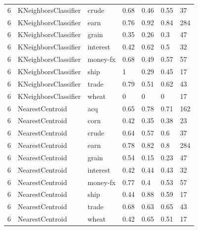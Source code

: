 \documentclass{article}
\begin{document}
\begin{table}[h]
\begin{tabular}{lllllll}
6             & KNeighborsClassifier   & crude           & 0.68               & 0.46            & 0.55              & 37               \\
6             & KNeighborsClassifier   & earn            & 0.76               & 0.92            & 0.84              & 284              \\
6             & KNeighborsClassifier   & grain           & 0.35               & 0.26            & 0.3               & 47               \\
6             & KNeighborsClassifier   & interest        & 0.42               & 0.62            & 0.5               & 32               \\
6             & KNeighborsClassifier   & money-fx        & 0.68               & 0.49            & 0.57              & 57               \\
6             & KNeighborsClassifier   & ship            & 1                  & 0.29            & 0.45              & 17               \\
6             & KNeighborsClassifier   & trade           & 0.79               & 0.51            & 0.62              & 43               \\
6             & KNeighborsClassifier   & wheat           & 0                  & 0               & 0                 & 17               \\
6             & NearestCentroid        & acq             & 0.65               & 0.78            & 0.71              & 162              \\
6             & NearestCentroid        & corn            & 0.42               & 0.35            & 0.38              & 23               \\
6             & NearestCentroid        & crude           & 0.64               & 0.57            & 0.6               & 37               \\
6             & NearestCentroid        & earn            & 0.78               & 0.82            & 0.8               & 284              \\
6             & NearestCentroid        & grain           & 0.54               & 0.15            & 0.23              & 47               \\
6             & NearestCentroid        & interest        & 0.42               & 0.44            & 0.43              & 32               \\
6             & NearestCentroid        & money-fx        & 0.77               & 0.4             & 0.53              & 57               \\
6             & NearestCentroid        & ship            & 0.44               & 0.88            & 0.59              & 17               \\
6             & NearestCentroid        & trade           & 0.68               & 0.63            & 0.65              & 43               \\
6             & NearestCentroid        & wheat           & 0.42               & 0.65            & 0.51              & 17               \\\end{tabular}
\end{table}
\end{document}
